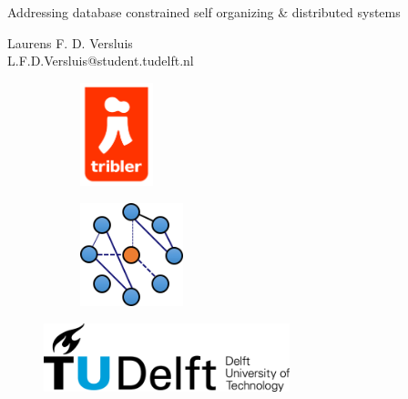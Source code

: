 \begin{titlepage}

\null\vfill

\begin{center}
\LARGE{Addressing database constrained self organizing \& distributed systems}
\end{center}

\vspace{1.5cm}

\begin{center}
Laurens F. D. Versluis\\
L.F.D.Versluis@student.tudelft.nl
\end{center}

\vfill

\centering
\begin{figure}[!b]
\captionsetup[subfigure]{labelformat=empty}
\begin{subfigure}{0.4\textwidth}
\centering
\includegraphics[height=3cm]{pics/triblerlogo}
\caption{}
\end{subfigure}%
\begin{subfigure}{0.6\textwidth}
\centering
\includegraphics[height=3cm]{pics/dslogo}
\caption{}
\end{subfigure}%
\end{figure}

\begin{figure}[!b]
\centering
\includegraphics[height=2cm]{pics/TUDLogo}
\end{figure}


\vspace{2.0cm}

\end{titlepage}
